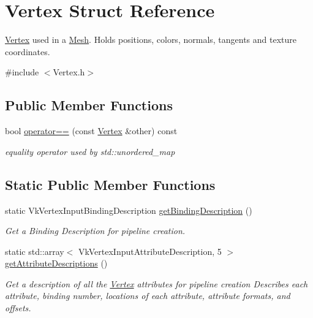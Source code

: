 \hypertarget{struct_vertex}{}\section{Vertex Struct Reference}
\label{struct_vertex}


\mbox{\hyperlink{struct_vertex}{Vertex}} used in a \mbox{\hyperlink{class_mesh}{Mesh}}. Holds positions, colors, normals, tangents and texture coordinates.  




{\ttfamily \#include $<$Vertex.\+h$>$}

\subsection*{Public Member Functions}
\begin{DoxyCompactItemize}
\item 
bool \mbox{\hyperlink{struct_vertex_a80a54a84866d511b63bcc6f38899bed9}{operator==}} (const \mbox{\hyperlink{struct_vertex}{Vertex}} \&other) const
\begin{DoxyCompactList}\small\item\em equality operator used by std\+::unordered\+\_\+map \end{DoxyCompactList}\end{DoxyCompactItemize}
\subsection*{Static Public Member Functions}
\begin{DoxyCompactItemize}
\item 
\mbox{\label{struct_vertex_aaca5987855365a64b2e48a60ccf4a6fc}} 
static Vk\+Vertex\+Input\+Binding\+Description \mbox{\hyperlink{struct_vertex_aaca5987855365a64b2e48a60ccf4a6fc}{get\+Binding\+Description}} ()
\begin{DoxyCompactList}\small\item\em Get a Binding Description for pipeline creation. \end{DoxyCompactList}\item 
\mbox{\label{struct_vertex_aecd3d21b049688af3f575bd6529ea6c1}} 
static std\+::array$<$ Vk\+Vertex\+Input\+Attribute\+Description, 5 $>$ \mbox{\hyperlink{struct_vertex_aecd3d21b049688af3f575bd6529ea6c1}{get\+Attribute\+Descriptions}} ()
\begin{DoxyCompactList}\small\item\em Get a description of all the \mbox{\hyperlink{struct_vertex}{Vertex}} attributes for pipeline creation Describes each attribute, binding number, locations of each attribute, attribute formats, and offsets. \end{DoxyCompactList}\end{DoxyCompactItemize}
